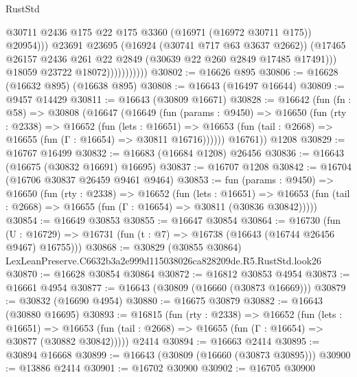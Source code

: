 \begin{lexlean}{RustStd}
\begin{coremodule}
                                  @30711
                                  @2436
                                  @175
                                  @22
                                  @175
                                  @3360
                                  (@16971 (@16972 @30711 @175))
                                  @20954)))
                            @23691
                            @23695
                            (@16924 (@30741 @717 @63 @3637 @2662))
                            (@17465
                              @26157
                              @2436
                              @261
                              @22
                              @2849
                              (@30639 @22 @260 @2849 @17485 @17491)))
                          @18059
                          @23722
                          @18072)))))))))))
@30802 := @16626 @895
@30806 := @16628 (@16632 @895) (@16638 @895)
@30808 := @16643 (@16497 @16644)
@30809 := @9457 @14429
@30811 := @16643 (@30809 @16671)
@30828 := @16642
    (fun (fn : @58) =>
    @30808
      (@16647
        (@16649
          (fun (params : @9450) =>
          @16650
            (fun (rty : @2338) =>
            @16652
              (fun (lets : @16651) =>
              @16653 (fun (tail : @2668) => @16655 (fun (Γ : @16654) => @30811 @16716))))))
        @16761))
    @1208
@30829 := @16767 @16499
@30832 := @16683 (@16684 @1208) @26456
@30836 := @16643 (@16675 (@30832 @16691) @16695)
@30837 := @16707 @1208
@30842 := @16704 (@16706 @30837 @26459 @9461 @9464)
@30853 := fun (params : @9450) =>
  @16650
    (fun (rty : @2338) =>
    @16652
      (fun (lets : @16651) =>
      @16653 (fun (tail : @2668) => @16655 (fun (Γ : @16654) => @30811 (@30836 @30842)))))
@30854 := @16649 @30853
@30855 := @16647 @30854
@30864 := @16730
    (fun (U : @16729) => @16731 (fun (t : @7) => @16738 (@16643 (@16744 @26456 @9467) @16755)))
@30868 := @30829 (@30855 @30864) LexLeanPreserve.C6632b3a2e999d115038026ca828209de.R5.RustStd.look26
@30870 := @16628 @30854 @30864
@30872 := @16812 @30853 @4954
@30873 := @16661 @4954
@30877 := @16643 (@30809 (@16660 (@30873 @16669)))
@30879 := @30832 (@16690 @4954)
@30880 := @16675 @30879
@30882 := @16643 (@30880 @16695)
@30893 := @16815
    (fun (rty : @2338) =>
    @16652
      (fun (lets : @16651) =>
      @16653 (fun (tail : @2668) => @16655 (fun (Γ : @16654) => @30877 (@30882 @30842)))))
    @2414
@30894 := @16663 @2414
@30895 := @30894 @16668
@30899 := @16643 (@30809 (@16660 (@30873 @30895)))
@30900 := @13886 @2414
@30901 := @16702 @30900
@30902 := @16705 @30900

\end{coremodule}
\end{lexlean}
